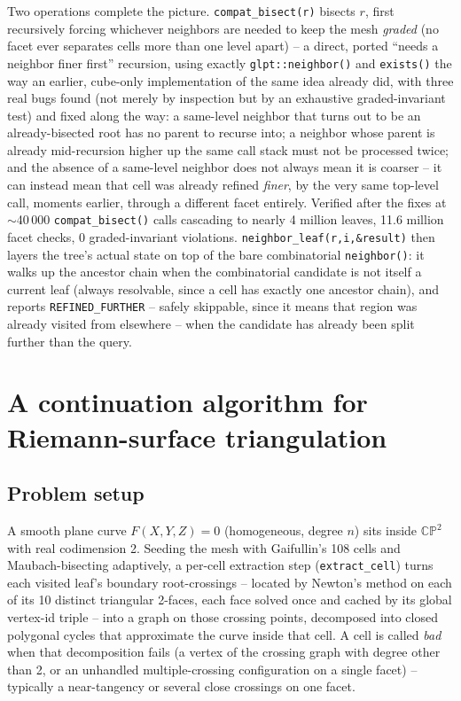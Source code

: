 \documentclass[11pt]{article}
\newcommand{\CP}{\mathbb{CP}}
\begin{document}
Two operations complete the picture. \texttt{compat\_bisect(r)} bisects
$r$, first recursively forcing whichever neighbors are needed to keep the
mesh \emph{graded} (no facet ever separates cells more than one level
apart) -- a direct, ported ``needs a neighbor finer first'' recursion,
using exactly \texttt{glpt::neighbor()} and \texttt{exists()} the way an
earlier, cube-only implementation of the same idea already did, with three
real bugs found (not merely by inspection but by an exhaustive
graded-invariant test) and fixed along the way: a same-level neighbor that
turns out to be an already-bisected root has no parent to recurse into; a
neighbor whose parent is already mid-recursion higher up the same call
stack must not be processed twice; and the absence of a same-level
neighbor does not always mean it is coarser -- it can instead mean that
cell was already refined \emph{finer}, by the very same top-level call,
moments earlier, through a different facet entirely. Verified after the
fixes at $\sim$40\,000 \texttt{compat\_bisect()} calls cascading to nearly
4 million leaves, 11.6 million facet checks, 0 graded-invariant violations.
\texttt{neighbor\_leaf(r,i,\&result)} then layers the tree's actual state
on top of the bare combinatorial \texttt{neighbor()}: it walks up the
ancestor chain when the combinatorial candidate is not itself a current
leaf (always resolvable, since a cell has exactly one ancestor chain), and
reports \texttt{REFINED\_FURTHER} -- safely skippable, since it means that
region was already visited from elsewhere -- when the candidate has
already been split further than the query.

\section{A continuation algorithm for Riemann-surface triangulation}
\label{sec:continuation}

\subsection{Problem setup}

A smooth plane curve $F(X,Y,Z)=0$ (homogeneous, degree $n$) sits inside
$\CP^2$ with real codimension 2. Seeding the mesh with Gaifullin's 108
cells and Maubach-bisecting adaptively, a per-cell extraction step
(\texttt{extract\_cell}) turns each visited leaf's boundary root-crossings
-- located by Newton's method on each of its 10 distinct triangular
2-faces, each face solved once and cached by its global vertex-id triple
-- into a graph on those crossing points, decomposed into closed
polygonal cycles that approximate the curve inside that cell. A cell is
called \emph{bad} when that decomposition fails (a vertex of the crossing
graph with degree other than 2, or an unhandled multiple-crossing
configuration on a single facet) -- typically a near-tangency or several
close crossings on one facet.
\end{document}
